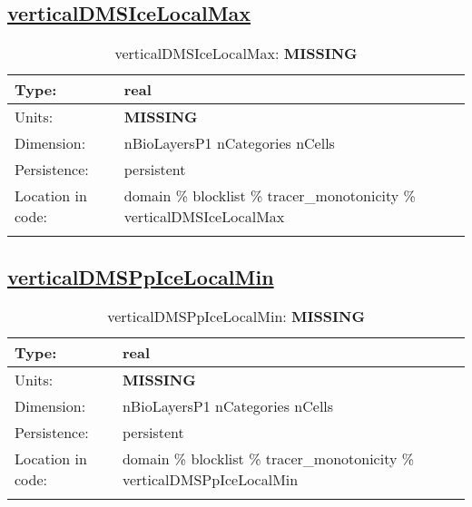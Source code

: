\subsection[verticalDMSIceLocalMax]{\hyperref[sec:var_tab_tracer_monotonicity]{verticalDMSIceLocalMax}}
\label{subsec:var_sec_tracer_monotonicity_verticalDMSIceLocalMax}
\begin{center}
\begin{longtable}{| p{2.0in} | p{4.0in} |}
        \hline 
        Type: & real \\
        \hline 
        Units: & {\bf \color{red} MISSING} \\
        \hline 
        Dimension: & nBioLayersP1 nCategories nCells \\
        \hline 
        Persistence: & persistent \\
        \hline 
         Location in code: & domain \% blocklist \% tracer\_monotonicity \% verticalDMSIceLocalMax \\
         \hline 
    \caption{verticalDMSIceLocalMax: {\bf \color{red} MISSING}}
\end{longtable}
\end{center}
\subsection[verticalDMSPpIceLocalMin]{\hyperref[sec:var_tab_tracer_monotonicity]{verticalDMSPpIceLocalMin}}
\label{subsec:var_sec_tracer_monotonicity_verticalDMSPpIceLocalMin}
\begin{center}
\begin{longtable}{| p{2.0in} | p{4.0in} |}
        \hline 
        Type: & real \\
        \hline 
        Units: & {\bf \color{red} MISSING} \\
        \hline 
        Dimension: & nBioLayersP1 nCategories nCells \\
        \hline 
        Persistence: & persistent \\
        \hline 
         Location in code: & domain \% blocklist \% tracer\_monotonicity \% verticalDMSPpIceLocalMin \\
         \hline 
    \caption{verticalDMSPpIceLocalMin: {\bf \color{red} MISSING}}
\end{longtable}
\end{center}
